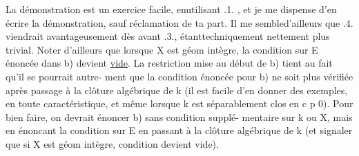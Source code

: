 La démonstration est un exercice facile, enutilisant .1. , et je
me dispense d'en écrire la démonstration, sauf réclamation de ta part. Il
 me sembled'ailleurs que .4. viendrait avantageusement dès avant .3.,
étanttechniquement nettement plus trivial. Noter d'ailleurs que lorsque
X est géom intègre, la condition sur E énoncée dans b) devient \uline{vide}.
La restriction mise au début de b) tient au fait qu'il se pourrait autre-%
ment que la condition énoncée pour b) ne soit plus vérifiée après passage
à la clôture algébrique de k (il est facile d'en donner des exemples,
en toute caractéristique, et même lorsque k est séparablement clos en
c p \hand{$>$} 0). Pour bien faire, on devrait énoncer b) sans condition supplé-%
mentaire sur k ou X, mais en énoncant la condition sur E en passant à la
clôture algébrique de k (et signaler que si X est géom intègre, 
condition devient vide). 

